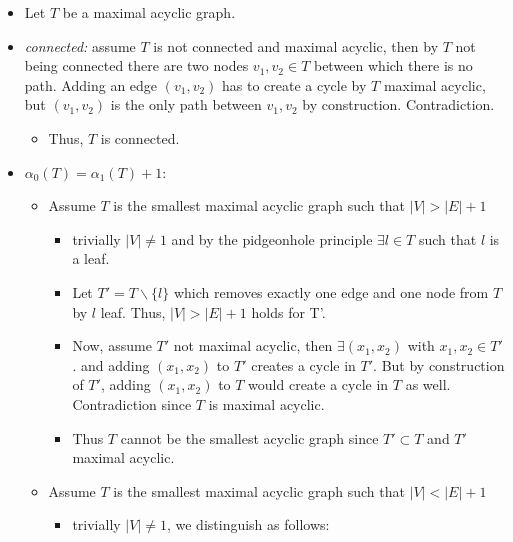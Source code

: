 \documentclass[
]{article}
\providecommand{\tightlist}{%
  \setlength{\itemsep}{0pt}\setlength{\parskip}{0pt}}
\begin{document}
\begin{itemize}
  \begin{itemize}
  \tightlist
  \item
    Let \(T\) be a maximal acyclic graph.
  \item
    \emph{connected:} assume \(T\) is not connected and maximal acyclic,
    then by \(T\) not being connected there are two nodes
    \(v_1,v_2 \in T\) between which there is no path. Adding an edge
    \((v_1,v_2)\) has to create a cycle by \(T\) maximal acyclic, but
    \((v_1,v_2)\) is the only path between \(v_1,v_2\) by construction.
    Contradiction.

    \begin{itemize}
    \tightlist
    \item
      Thus, \(T\) is connected.
    \end{itemize}
  \item
    \(\alpha_0(T) = \alpha_1(T) + 1\):

    \begin{itemize}
    \tightlist
    \item
      Assume \(T\) is the smallest maximal acyclic graph such that
      \(|V| > |E| + 1\)

      \begin{itemize}
      \tightlist
      \item
        trivially \(|V| \neq 1\) and by the pidgeonhole principle
        \(\exists l \in T\) such that \(l\) is a leaf.
      \item
        Let \(T' = T \backslash \{l\}\) which removes exactly one edge
        and one node from \(T\) by \(l\) leaf. Thus, \(|V| > |E| + 1\)
        holds for T'.
      \item
        Now, assume \(T'\) not maximal acyclic, then
        \(\exists (x_1,x_2)\) with \(x_1,x_2 \in T'\). and adding
        \((x_1,x_2)\) to \(T'\) creates a cycle in \(T'\). But by
        construction of \(T'\), adding \((x_1,x_2)\) to \(T\) would
        create a cycle in \(T\) as well. Contradiction since \(T\) is
        maximal acyclic.
      \item
        Thus \(T\) cannot be the smallest acyclic graph since
        \(T' \subset T\) and \(T'\) maximal acyclic.
      \end{itemize}
    \item
      Assume \(T\) is the smallest maximal acyclic graph such that
      \(|V| < |E| + 1\)

      \begin{itemize}
      \tightlist
      \item
        trivially \(|V| \neq 1\), we distinguish as follows:


\end{itemize}
\end{itemize}
\end{itemize}
\end{itemize}
\end{document}
